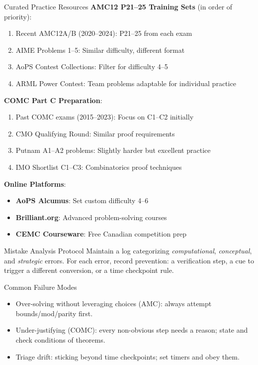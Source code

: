 \documentclass{article}
\begin{document}
\begin{specializedbox}{Curated Practice Resources}
\textbf{AMC12 P21--25 Training Sets} (in order of priority):
\begin{enumerate}[nosep]
\item Recent AMC12A/B (2020--2024): P21--25 from each exam
\item AIME Problems 1--5: Similar difficulty, different format
\item AoPS Contest Collections: Filter for difficulty 4--5
\item ARML Power Contest: Team problems adaptable for individual practice
\end{enumerate}

\textbf{COMC Part C Preparation}:
\begin{enumerate}[nosep]
\item Past COMC exams (2015--2023): Focus on C1--C2 initially
\item CMO Qualifying Round: Similar proof requirements
\item Putnam A1--A2 problems: Slightly harder but excellent practice
\item IMO Shortlist C1--C3: Combinatorics proof techniques
\end{enumerate}

\textbf{Online Platforms}:
\begin{itemize}[nosep]
\item \textbf{AoPS Alcumus}: Set custom difficulty 4--6
\item \textbf{Brilliant.org}: Advanced problem-solving courses
\item \textbf{CEMC Courseware}: Free Canadian competition prep
\end{itemize}
\end{specializedbox}

\begin{contextbox}{Mistake Analysis Protocol}
Maintain a log categorizing \emph{computational}, \emph{conceptual}, and \emph{strategic} errors. For each error, record prevention: a verification step, a cue to trigger a different conversion, or a time checkpoint rule.
\end{contextbox}

\begin{warningbox}{Common Failure Modes}
\begin{itemize}
    \item Over-solving without leveraging choices (AMC): always attempt bounds/mod/parity first.
    \item Under-justifying (COMC): every non-obvious step needs a reason; state and check conditions of theorems.
    \item Triage drift: sticking beyond time checkpoints; set timers and obey them.
\end{itemize}
\end{warningbox}
\end{document}
